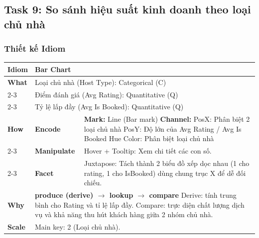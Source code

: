 \subsection{Task 9: So sánh hiệu suất kinh doanh theo loại chủ nhà}

\subsubsection{Thiết kế Idiom}

\begin{table}[H]
\centering
\renewcommand{\arraystretch}{1.1}
\begin{tabularx}{\textwidth}{|l|l|X|}
\hline
\textbf{Idiom} & \multicolumn{2}{l|}{\textbf{Bar Chart}} \\ \hline
\textbf{What}
& \multicolumn{2}{X|}{Loại chủ nhà (Host Type): Categorical (C)} \\ \cline{2-3}
& \multicolumn{2}{X|}{Điểm đánh giá (Avg Rating): Quantitative (Q)} \\ \cline{2-3}
& \multicolumn{2}{X|}{Tỷ lệ lấp đầy (Avg Is Booked): Quantitative (Q)} \\ \hline
\textbf{How}
& \textbf{Encode} &
\textbf{Mark:} Line (Bar mark) \newline
\textbf{Channel:} \newline
\hspace*{1em} PosX: Phân biệt 2 loại chủ nhà \newline
\hspace*{1em} PosY: Độ lớn của Avg Rating / Avg Is Booked \newline
\hspace*{1em} Hue Color: Phân biệt loại chủ nhà \\ \cline{2-3}
& \textbf{Manipulate} &
Hover + Tooltip: Xem chi tiết các con số. \\ \cline{2-3}
& \textbf{Facet} &
Juxtapose: Tách thành 2 biểu đồ xếp dọc nhau (1 cho rating, 1 cho IsBooked) dùng chung trục X để dễ đối chiếu. \\ \hline
\textbf{Why} & \multicolumn{2}{X|}{
\textbf{produce (derive) $\rightarrow$ lookup $\rightarrow$ compare} \newline
Derive: tính trung bình cho Rating và tỉ lệ lấp đầy. Compare: trực diện chất lượng dịch vụ và khả năng thu hút khách hàng giữa 2 nhóm chủ nhà.
} \\ \hline
\textbf{Scale} & \multicolumn{2}{X|}{
Main key: 2 (Loại chủ nhà).
} \\ \hline
\end{tabularx}
\end{table}


